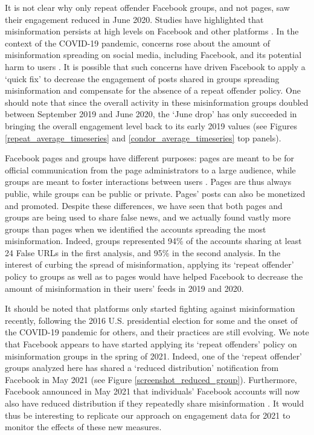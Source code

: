 \documentclass[review]{elsarticle}
\begin{document}
{{It is not clear why only repeat offender Facebook groups, and not pages, saw their engagement reduced in June 2020.
Studies have highlighted that misinformation persists at high levels on Facebook and other platforms \citep{kornbluh2020new, resnick2018iffy}.
In the context of the COVID-19 pandemic, concerns rose about the amount of misinformation spreading on social media, including Facebook, and its potential harm to users \citep{johnson2020online}.
It is possible that such concerns have driven Facebook to apply a `quick fix' to decrease the engagement of posts shared in groups spreading misinformation and compensate for the absence of a repeat offender policy.
One should note that since the overall activity in these misinformation groups doubled between September 2019 and June 2020, the `June drop' has only succeeded in bringing the overall engagement level back to its early 2019 values (see Figures \ref{repeat_average_timeseries} and \ref{condor_average_timeseries} top panels).

Facebook pages and groups have different purposes: pages are meant to be for official communication from the page administrators to a large audience, while groups are meant to foster interactions between users \citep{differenceGroupAndPage}. 
Pages are thus always public, while groups can be public or private.
Pages' posts can also be monetized and promoted.
Despite these differences, we have seen that both pages and groups are being used to share false news, and we actually found vastly more groups than pages when we identified the accounts spreading the most misinformation.
Indeed, groups represented 94\% of the accounts sharing at least 24 False URLs in the first analysis, and 95\% in the second analysis.
In the interest of curbing the spread of misinformation, applying its `repeat offender' policy to groups as well as to pages would have helped Facebook to decrease the amount of misinformation in their users’ feeds in 2019 and 2020.

It should be noted that platforms only started fighting against misinformation recently, following the 2016 U.S. presidential election for some and the onset of the COVID-19 pandemic for others, and their practices are still evolving.
We note that Facebook appears to have started applying its `repeat offenders’ policy on misinformation groups in the spring of 2021. 
Indeed, one of the `repeat offender' groups analyzed here has shared a `reduced distribution' notification from Facebook in May 2021 (see Figure \ref{screenshot_reduced_group}).
Furthermore, Facebook announced in May 2021 that individuals’ Facebook accounts will now also have reduced distribution if they repeatedly share misinformation \cite{FacebookReduceUsers}.
It would thus be interesting to replicate our approach on engagement data for 2021 to monitor the effects of these new measures.

}}
\end{document}
